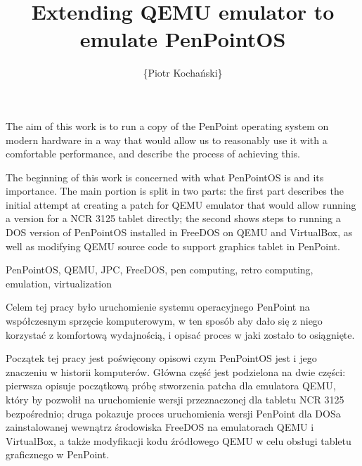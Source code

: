 \documentclass[
    bindingoffset=5mm,  %
    footnoteindent=3mm, %
    hyphenation=true    %
]{src/wut-thesis}
\begin{document}
\title{
    Extending QEMU emulator to emulate PenPointOS
}

\author{\{Piotr Kochański\}}
\date{\the\year}
\maketitle

\cleardoublepage %

\abstract
The aim of this work is to run a copy of the PenPoint operating system on
modern hardware in a way that would allow us to reasonably use it with
a comfortable performance, and describe the process of achieving this.

The beginning of this work is concerned with what PenPointOS is and its
importance. The main portion is split in two parts: the first part describes
the initial attempt at creating a patch for QEMU emulator that would allow
running a version for a NCR 3125 tablet directly; the second shows steps to
running a DOS version of PenPointOS installed in FreeDOS on QEMU and
VirtualBox, as well as modifying QEMU source code to support graphics tablet in
PenPoint.

\keywords
PenPointOS, QEMU, JPC, FreeDOS, pen computing, retro computing, emulation,
virtualization

\clearpage

\secondabstract
Celem tej pracy było uruchomienie systemu operacyjnego PenPoint na współczesnym
sprzęcie komputerowym, w ten sposób aby dało się z niego korzystać z komfortową
wydajnością, i opisać proces w jaki zostało to osiągnięte.

Początek tej pracy jest poświęcony opisowi czym PenPointOS jest i jego znaczeniu
w historii komputerów.  Główna część jest podzielona na dwie części: pierwsza
opisuje początkową próbę stworzenia patcha dla emulatora QEMU, który by pozwolił
na uruchomienie wersji przeznaczonej dla tabletu NCR 3125 bezpośrednio; druga
pokazuje proces uruchomienia wersji PenPoint dla DOSa zainstalowanej wewnątrz
środowiska FreeDOS na emulatorach QEMU i VirtualBox, a także modyfikacji kodu
źródłowego QEMU w celu obsługi tabletu graficznego w PenPoint.
\end{document}
